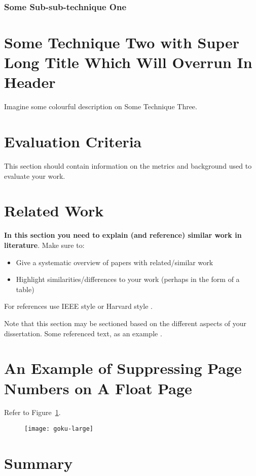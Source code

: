 \subsubsection{Some Sub-sub-technique One}
\blindtext
{}
\blindtext
{}

\section[Some Technique Two]{Some Technique Two with Super Long Title Which Will Overrun In Header}
\blindtext[5]

Imagine some colourful description on Some Technique Three.


\section{Evaluation Criteria}
This section should contain information on the metrics and background used to evaluate your work.

\section{Related Work}
\textbf{In this section you need to explain (and reference) similar work in literature}.  Make sure to:

\begin{itemize}
 \item Give a systematic overview of papers with related/similar work
 \item Highlight similarities/differences to your work (perhaps in the form of a table)
\end{itemize}

For references use IEEE style \citep{IEEERefStyle} or Harvard style \citep{HarvRefStyle}.

Note that this section may be sectioned based on the different aspects of your dissertation.  Some referenced text, as an example \citep{Arrighi2003, WithersMartinez2012, Ebejer2016}.

\section{An Example of Suppressing Page Numbers on A Float Page}

Refer to Figure~\ref{fig:largegoku}.

\begin{figure}[!ht]
	\centering
	\texttt{[image: goku-large]}
	\caption[Short Random Caption]{\blindtext}        
	\label{fig:largegoku}
\end{figure}

\blindtext

\section{Summary}
\blindtext

